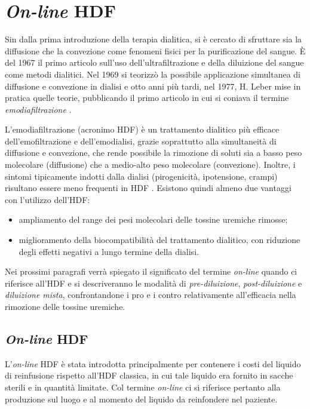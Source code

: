 \chapter{\textit{On-line} HDF}\label{ch:prepost}

Sin dalla prima introduzione della terapia dialitica, si è cercato di sfruttare sia la diffusione che la convezione come fenomeni fisici per la purificazione del sangue. È del 1967 il primo articolo sull'uso dell'ultrafiltrazione e della diluizione del sangue come metodi dialitici. Nel 1969 si teorizzò la possibile applicazione simultanea di diffusione e convezione in dialisi e otto anni più tardi, nel 1977, H. Leber mise in pratica quelle teorie, pubblicando il primo articolo in cui si coniava il termine \textit{emodiafiltrazione} \cite{bib:history}.

L'emodiafiltrazione (acronimo HDF) è un trattamento dialitico più efficace dell'emofiltrazione e dell'emodialisi, grazie soprattutto alla simultaneità di diffusione e convezione, che rende possibile la rimozione di soluti sia a basso peso molecolare (diffusione) che a medio-alto peso molecolare (convezione). Inoltre, i sintomi tipicamente indotti dalla dialisi (pirogenicità, ipotensione, crampi) risultano essere meno frequenti in HDF \cite{canaud}. Esistono quindi almeno due vantaggi con l'utilizzo dell'HDF:
\begin{itemize}
\item ampliamento del range dei pesi molecolari delle tossine uremiche rimosse;
\item miglioramento della biocompatibilità del trattamento dialitico, con riduzione degli effetti negativi a lungo termine della dialisi.
\end{itemize}
Nei prossimi paragrafi 
verrà spiegato il significato del termine \textit{on-line} quando ci riferisce all'HDF e si descriveranno le modalità di \textit{pre-diluizione}, \textit{post-diluizione} e \textit{diluizione mista}, confrontandone i pro e i contro relativamente all'efficacia nella rimozione delle tossine uremiche.

\section{\textit{On-line} HDF}
L'\textit{on-line} HDF è stata introdotta principalmente per contenere i costi del liquido di reinfusione rispetto all'HDF classica, in cui tale liquido era fornito in sacche sterili e in quantità limitate. Col termine \textit{on-line} ci si riferisce pertanto alla produzione sul luogo e al momento del liquido da reinfondere nel paziente.

